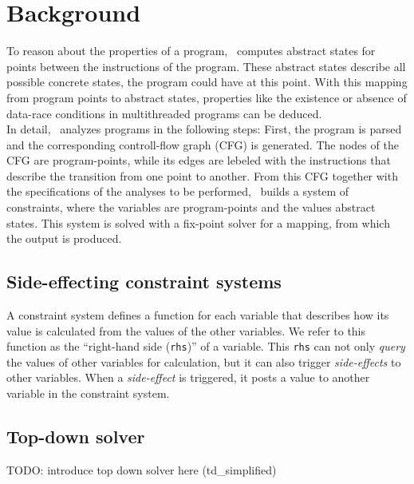 \section{Background}
\label{sec:background}
To reason about the properties of a program, \gob\ computes abstract states for points between the instructions of the program. These abstract states describe all possible concrete states, the program could have at this point. With this mapping from program points to abstract states, properties like the existence or absence of data-race conditions in multithreaded programs can be deduced.\\
In detail, \gob\ analyzes programs in the following steps: First, the program is parsed and the corresponding controll-flow graph (CFG) is generated. The nodes of the CFG are program-points, while its edges are lebeled with the instructions that describe the transition from one point to another. From this CFG together with the specifications of the analyses to be performed, \gob\ builds a system of constraints, where the variables are program-points and the values abstract states. This system is solved with a fix-point solver for a mapping, from which the output is produced.

  \subsection{Side-effecting constraint systems}
  \label{sec:background:constrSys}
  A constraint system defines a function for each variable that describes how its value is calculated from the values of the other variables. We refer to this function as the ``right-hand side (\texttt{rhs})'' of a variable. This \texttt{rhs} can not only \textit{query} the values of other variables for calculation, but it can also trigger \textit{side-effects} to other variables. When a \textit{side-effect} is triggered, it posts a value to another variable in the constraint system.   

  \subsection{Top-down solver}
  \label{sec:background:td}
  TODO: introduce top down solver here (td\_simplified)
